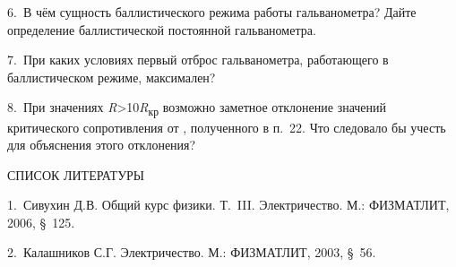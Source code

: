 \documentclass[]{article}
\begin{document}
6.~В чём сущность баллистического режима работы гальванометра? Дайте
определение баллистической постоянной гальванометра.

7.~При каких условиях первый отброс гальванометра, работающего в
баллистическом режиме, максимален?

8.~При значениях \emph{R}\textgreater{}10\emph{R}\textsubscript{кр}
возможно заметное отклонение значений критического сопротивления от ,
полученного в п.~22. Что следовало бы учесть для объяснения этого
отклонения?

СПИСОК ЛИТЕРАТУРЫ

1.~Сивухин Д.В. Общий курс физики. Т.~III. Электричество. М.: ФИЗМАТЛИТ,
2006, §~125.

2.~Калашников С.Г. Электричество. М.: ФИЗМАТЛИТ, 2003, §~56.
\end{document}
